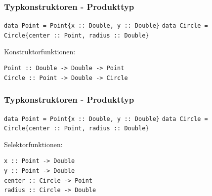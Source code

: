 \documentclass[fleqn,11pt,aspectratio=43]{beamer}
\begin{document}
\begin{frame}[fragile]
\frametitle{Typkonstruktoren - Produkttyp}
\begin{block}{\vspace*{-3ex}}
\lstinline|data Point = Point{x :: Double, y :: Double}|
\lstinline|data Circle = Circle{center :: Point, radius :: Double}|
\end{block} 
Konstruktorfunktionen: 
\pause
\begin{lstlisting}
Point :: Double -> Double -> Point
Circle :: Point -> Double -> Circle
\end{lstlisting}
\end{frame}

\begin{frame}[fragile]
\frametitle{Typkonstruktoren - Produkttyp} 
\begin{block}{\vspace*{-3ex}}
\lstinline|data Point = Point{x :: Double, y :: Double}|
\lstinline|data Circle = Circle{center :: Point, radius :: Double}|
\end{block} 
Selektorfunktionen: 
\pause
\begin{lstlisting}
x :: Point -> Double
y :: Point -> Double
center :: Circle -> Point
radius :: Circle -> Double
\end{lstlisting}
\end{frame}

\end{document}
